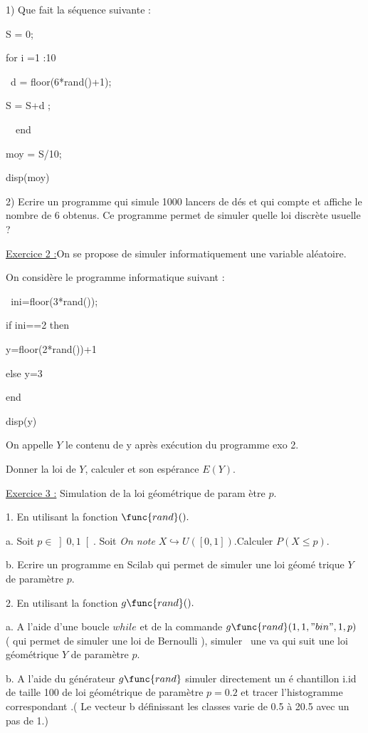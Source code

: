 \documentclass{article}
\begin{document}
1) Que fait la s\'{e}quence suivante :

S = 0;

for i =1 :10

\ d = floor(6*rand()+1);\ 

S = S+d ;

\ \ end

moy = S/10;

disp(moy)

2) Ecrire un programme qui simule 1000 lancers de d\'{e}s et qui compte et
affiche le nombre de 6 obtenus. Ce programme permet de simuler quelle loi
discr\`{e}te usuelle ?\ 

\underline{Exercice 2 :}On se propose de simuler informatiquement une
variable al\'{e}atoire.

On consid\`{e}re le programme informatique suivant :

\texttt{\ }ini=floor(3*rand());

if ini==2 then

y=floor(2*rand())+1

else y=3

end

disp(y)

On appelle $Y$ le contenu de y apr\`{e}s ex\'{e}cution du programme exo 2.

Donner la loi de $Y$, calculer et son esp\'{e}rance $E(Y).$

\underline{Exercice 3 :} Simulation de la loi g\'{e}om\'{e}trique de param%
\`{e}tre $p.$

1. En utilisant la fonction $\func{rand}().$

a. Soit $p\in \left] 0,1\right[ .$ Soit \textit{On note }$X\hookrightarrow U(%
\left[ 0,1\right] ).$Calculer $P(X\leq p).$

b. Ecrire un programme en Scilab qui permet de simuler une loi g\'{e}om\'{e}%
trique $Y$ de param\`{e}tre $p.$

2. En utilisant la fonction $g\func{rand}().$

a. A l'aide d'une boucle $while$ et de la commande $g\func{rand}%
(1,1,"bin",1,p)$ ( qui permet de simuler une loi de Bernoulli ), simuler \
une va qui suit une loi g\'{e}om\'{e}trique $Y$ de param\`{e}tre $p.$

b. A l'aide du g\'{e}n\'{e}rateur $g\func{rand}$ simuler directement un \'{e}%
chantillon i.id de taille 100 de loi g\'{e}om\'{e}trique de param\`{e}tre $%
p=0.2$ et tracer l'histogramme correspondant .( Le vecteur b d\'{e}finissant
les classes varie de 0.5 \`{a} 20.5 avec un pas de 1.)
\end{document}
